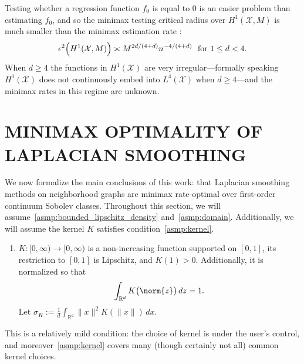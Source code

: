 \documentclass[twoside]{article}
\newcommand{\Reals}{\mathbb{R}}
\newcommand{\1}{\mathbf{1}}
\newcommand{\Rd}{\Reals^d}
\newcommand{\Xset}{\mathcal{X}}
\newcommand{\Leb}{L}
\theoremstyle{definition}
\theoremstyle{remark}
\begin{document}
Testing whether a regression function $f_0$ is equal to $0$ is an easier problem than estimating $f_0$, and so the minimax testing critical radius over $H^1(\Xset,M)$ is much smaller than the minimax estimation rate \citep{ingster2009}:
\begin{equation}
\label{eqn:sobolev_space_testing_critical_radius}
\epsilon^2\Bigl(H^1(\Xset,M)\Bigr) \asymp M^{2d/(4 + d)}n^{-4/(4 + d)}~~\textrm{for $1 \leq d < 4$.}
\end{equation}
When $d \geq 4$ the functions in $H^1(\Xset)$ are very irregular---formally speaking $H^1(\Xset)$ does not continuously embed into $\Leb^4(\Xset)$ when $d \geq 4$---and the minimax rates in this regime are unknown. 

\section{MINIMAX OPTIMALITY OF LAPLACIAN SMOOTHING}
\label{sec:minimax_optimal_laplacian_smoothing}

We now formalize the main conclusions of this work: that Laplacian smoothing methods on neighborhood graphs are minimax rate-optimal over first-order continuum Sobolev classes. Throughout this section, we will assume~\ref{asmp:bounded_lipschitz_density} and~\ref{asmp:domain}. Additionally, we will assume the kernel $K$ satisfies condition~\ref{asmp:kernel}.
\begin{enumerate}[label=(K\arabic*)]
	\item
	\label{asmp:kernel}
	$K:[0,\infty) \to [0,\infty)$ is a non-increasing function supported on $[0,1]$, its restriction to $[0,1]$ is Lipschitz, and $K(1) > 0$. Additionally, it is normalized so that
	\begin{equation*}
	\int_{\Reals^d} K\bigl(\norm{z}\bigr) \,dz = 1.
	\end{equation*}
	Let $\sigma_K := \frac{1}{d} \int_{\Rd} \|x\|^2 K(\|x\|) \,dx$.
\end{enumerate}
This is a relatively mild condition: the choice of kernel is under the user's control, and moreover~\ref{asmp:kernel} covers many (though certainly not all) common kernel choices.
\end{document}

